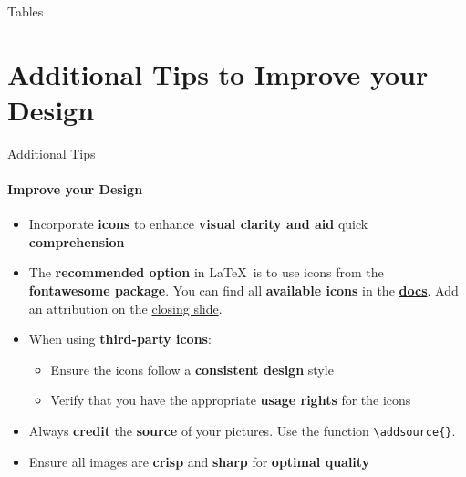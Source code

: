 \documentclass[aspectratio=169]{beamer}
\begin{document}
\begin{frame}{Tables}
    
\end{frame}


\section{Additional \textbf{Tips} to Improve your Design}

\begin{frame}
    \agenda     
\end{frame}

\begin{frame}{Additional Tips}
    \framesubtitle{Improve your Design}

    \begin{coloredblock}
        \begin{itemize}
            \item Incorporate \textbf{icons} to enhance \textbf{visual clarity and aid }quick \textbf{comprehension}
            \item The \textbf{recommended option} in \LaTeX~is to use icons from the \textbf{fontawesome package}. You can find all \textbf{available icons} in the \href{https://mirror.easyname.at/ctan/fonts/fontawesome5/doc/fontawesome5.pdf}{\textbf{docs}}. Add an attribution on the \hyperlink{frame:closing_slide}{closing slide}.

            \item When using \textbf{third-party icons}:
            \vspace{-0.5\topsep}
            \begin{itemize}
                \item Ensure the icons follow a \textbf{consistent design} style
                \item Verify that you have the appropriate \textbf{usage rights} for the icons
            \end{itemize}
        \end{itemize}
    \end{coloredblock}

        \begin{coloredblock}
            \begin{itemize}
                \item Always \textbf{credit} the \textbf{source} of your pictures. Use the function \texttt{\textbackslash addsource\{\}}.
                \item Ensure all images are \textbf{crisp} and \textbf{sharp} for \textbf{optimal quality}
            \end{itemize}
        \end{coloredblock}
\end{frame}
\end{document}
